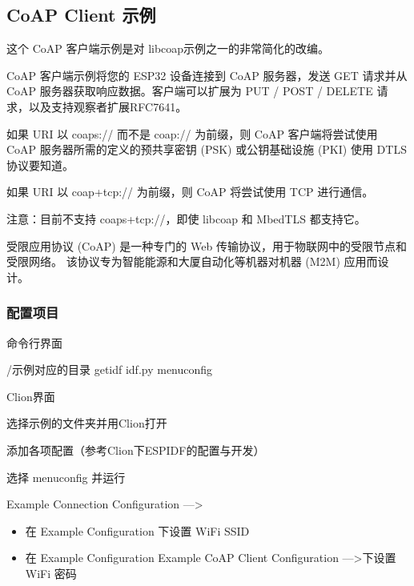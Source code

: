 \documentclass[a4paper,12pt,english]{sphinxmanual}
\begin{document}
{{\sphinxAtStartPar
{}


\subsection{CoAP Client 示例}
\label{\detokenize{exp-esp32/coap:coap-client}}
\sphinxAtStartPar
这个 CoAP 客户端示例是对 libcoap示例之一的非常简化的改编。

\sphinxAtStartPar
CoAP 客户端示例将您的 ESP32 设备连接到 CoAP 服务器，发送 GET 请求并从 CoAP 服务器获取响应数据。客户端可以扩展为 PUT / POST / DELETE 请求，以及支持观察者扩展RFC7641。

\sphinxAtStartPar
如果 URI 以 coaps:// 而不是 coap:// 为前缀，则 CoAP 客户端将尝试使用 CoAP 服务器所需的定义的预共享密钥 (PSK) 或公钥基础设施 (PKI) 使用 DTLS 协议要知道。

\sphinxAtStartPar
如果 URI 以 coap+tcp:// 为前缀，则 CoAP 将尝试使用 TCP 进行通信。

\sphinxAtStartPar
注意：目前不支持 coaps+tcp://，即使 libcoap 和 MbedTLS 都支持它。

\sphinxAtStartPar
受限应用协议 (CoAP) 是一种专门的 Web 传输协议，用于物联网中的受限节点和受限网络。
该协议专为智能能源和大厦自动化等机器对机器 (M2M) 应用而设计。


\subsubsection{配置项目}
\label{\detokenize{exp-esp32/coap:id5}}
\sphinxAtStartPar
命令行界面

\begin{sphinxVerbatim}[commandchars=\\\{\}]
 /示例对应的目录
get\PYGZhy{}idf
idf.py menuconfig
\end{sphinxVerbatim}

\sphinxAtStartPar
Clion界面

\sphinxAtStartPar
选择示例的文件夹并用Clion打开

\sphinxAtStartPar
添加各项配置（参考Clion下ESP\sphinxhyphen{}IDF的配置与开发）

\sphinxAtStartPar
选择 menuconfig 并运行

\sphinxAtStartPar
Example Connection Configuration —>
\begin{itemize}
\item {} 
\sphinxAtStartPar
在 Example Configuration 下设置 WiFi SSID

\item {} 
\sphinxAtStartPar
在 Example Configuration Example  CoAP Client Configuration —>下设置 WiFi 密码


\end{itemize}}}
\end{document}
